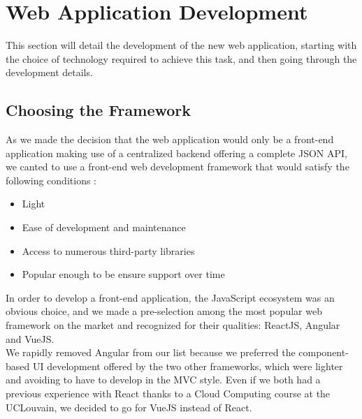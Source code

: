 \documentclass{eplmastersthesis}
\begin{document}
    \section{Web Application Development}

      This section will detail the development of the new web application,
      starting with the choice of technology required to achieve this task, and
      then going through the development details.

      \subsection{Choosing the Framework}

        As we made the decision that the web application would only be a
        front-end application making use of a centralized backend offering
        a complete JSON API, we canted to use a front-end web development
        framework that would satisfy the following conditions : \\

        \begin{itemize}
          \item Light
          \item Ease of development and maintenance
          \item Access to numerous third-party libraries
          \item Popular enough to be ensure support over time
        \end{itemize}

        In order to develop a front-end application, the JavaScript ecosystem
        was an obvious choice, and we made a pre-selection among the most
        popular web framework on the market and recognized for their qualities:
        ReactJS, Angular and VueJS.\\
        We rapidly removed Angular from our list because we preferred the
        component-based UI development offered by the two other frameworks,
        which were lighter and avoiding to have to develop in the MVC style.
        Even if we both had a previous experience with React thanks to a
        Cloud Computing course at the UCLouvain, we decided to go for VueJS
        instead of React.\\
\end{document}
